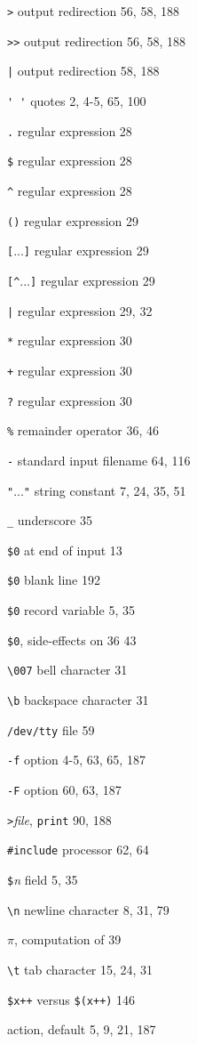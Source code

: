 \begin{multicols}{2}
\verb'>' output redirection 56, 58, 188

\verb'>>' output redirection 56, 58, 188

\verb'|' output redirection 58, 188

\verb"' '" quotes 2, 4-5, 65, 100

\verb'.' regular expression 28

\verb'$' regular expression 28

\verb'^' regular expression 28

\verb'()' regular expression 29

\verb'['...\verb']' regular expression 29

\verb'[^'...\verb']' regular expression 29

\verb'|' regular expression 29, 32

\verb'*' regular expression 30

\verb'+' regular expression 30

\verb'?' regular expression 30

\verb'%' remainder operator 36, 46

\verb'-' standard input filename 64, 116

\verb'"'...\verb'"' string constant 7, 24, 35, 51

\verb'_' underscore 35

\verb'$0' at end of input 13

\verb'$0' blank line 192

\verb'$0' record variable 5, 35

\verb'$0', side-effects on 36 43

\verb'\007' bell character 31

\verb'\b' backspace character 31

\verb'/dev/tty' file 59

\verb'-f' option 4-5, 63, 65, 187

\verb'-F' option 60, 63, 187

\verb'>'\textit{file}, \verb'print' 90, 188

\verb'#include' processor 62, 64

\verb'$'\textit{n} field 5, 35

\verb'\n' newline character 8, 31, 79

$\pi$, computation of 39

\verb'\t' tab character 15, 24, 31

\verb'$x++' versus \verb'$(x++)' 146

action, default 5, 9, 21, 187


\end{multicols}
